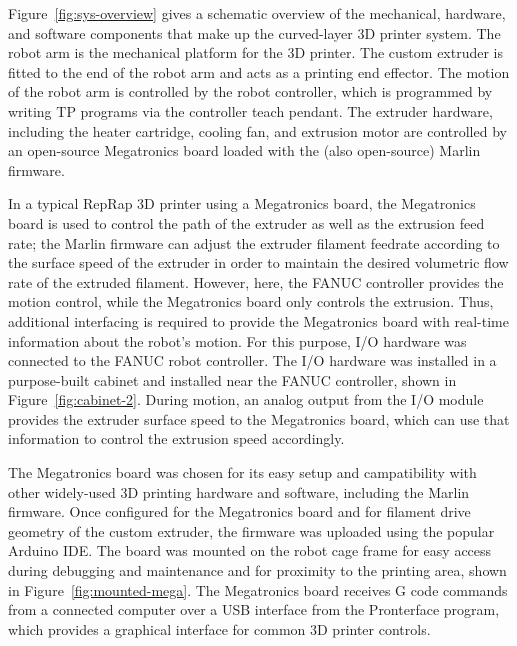 Figure~\ref{fig:sys-overview} gives a schematic overview of the mechanical, hardware, and software components that make up the curved-layer 3D printer system. The robot arm is the mechanical platform for the 3D printer. The custom extruder is fitted to the end of the robot arm and acts as a printing end effector. The motion of the robot arm is controlled by the robot controller, which is programmed by writing TP programs via the controller teach pendant. The extruder hardware, including the heater cartridge, cooling fan, and extrusion motor are controlled by an open-source Megatronics board loaded with the (also open-source) Marlin firmware. 

In a typical RepRap 3D printer using a Megatronics board, the Megatronics board is used to control the path of the extruder as well as the extrusion feed rate; the Marlin firmware can adjust the extruder filament feedrate according to the surface speed of the extruder in order to maintain the desired volumetric flow rate of the extruded filament. However, here, the FANUC controller provides the motion control, while the Megatronics board only controls the extrusion. Thus, additional interfacing is required to provide the Megatronics board with real-time information about the robot's motion. For this purpose, I/O hardware was connected to the FANUC robot controller. The I/O hardware was installed in a purpose-built cabinet and installed near the FANUC controller, shown in Figure~\ref{fig:cabinet-2}. During motion, an analog output from the I/O module provides the extruder surface speed to the Megatronics board, which can use that information to control the extrusion speed accordingly.

The Megatronics board was chosen for its easy setup and campatibility with other widely-used 3D printing hardware and software, including the Marlin firmware. Once configured for the Megatronics board and for filament drive geometry of the custom extruder, the firmware was uploaded using the popular Arduino IDE. The board was mounted on the robot cage frame for easy access during debugging and maintenance and for proximity to the printing area, shown in Figure~\ref{fig:mounted-mega}. The Megatronics board receives G code commands from a connected computer over a USB interface from the Pronterface program, which provides a graphical interface for common 3D printer controls. 

